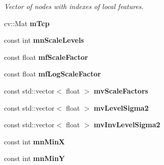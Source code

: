 \begin{DoxyCompactItemize}
\begin{DoxyCompactList}\small\item\em Vector of nodes with indexes of local features. \end{DoxyCompactList}\item 
\hypertarget{classORB__SLAM2_1_1KeyFrame_aab9c8e2e4aa4757ad0be28b2f49a3cf7}{cv\-::\-Mat {\bfseries m\-Tcp}}\label{classORB__SLAM2_1_1KeyFrame_aab9c8e2e4aa4757ad0be28b2f49a3cf7}

\item 
\hypertarget{classORB__SLAM2_1_1KeyFrame_abd3b2544330774672483656955e0ca03}{const int {\bfseries mn\-Scale\-Levels}}\label{classORB__SLAM2_1_1KeyFrame_abd3b2544330774672483656955e0ca03}

\item 
\hypertarget{classORB__SLAM2_1_1KeyFrame_a18fbd1aa1da7c7cd68cb05d8e5b78a08}{const float {\bfseries mf\-Scale\-Factor}}\label{classORB__SLAM2_1_1KeyFrame_a18fbd1aa1da7c7cd68cb05d8e5b78a08}

\item 
\hypertarget{classORB__SLAM2_1_1KeyFrame_ae7ca053915d4aaba66c1fd5962182d14}{const float {\bfseries mf\-Log\-Scale\-Factor}}\label{classORB__SLAM2_1_1KeyFrame_ae7ca053915d4aaba66c1fd5962182d14}

\item 
\hypertarget{classORB__SLAM2_1_1KeyFrame_a8cdc02a7bccd3b75e61351a1f14f9c04}{const std\-::vector$<$ float $>$ {\bfseries mv\-Scale\-Factors}}\label{classORB__SLAM2_1_1KeyFrame_a8cdc02a7bccd3b75e61351a1f14f9c04}

\item 
\hypertarget{classORB__SLAM2_1_1KeyFrame_aa4a9029bf7ea62953ac38644756fcd3b}{const std\-::vector$<$ float $>$ {\bfseries mv\-Level\-Sigma2}}\label{classORB__SLAM2_1_1KeyFrame_aa4a9029bf7ea62953ac38644756fcd3b}

\item 
\hypertarget{classORB__SLAM2_1_1KeyFrame_a320d543b9585072c264b4e6f7e334bad}{const std\-::vector$<$ float $>$ {\bfseries mv\-Inv\-Level\-Sigma2}}\label{classORB__SLAM2_1_1KeyFrame_a320d543b9585072c264b4e6f7e334bad}

\item 
\hypertarget{classORB__SLAM2_1_1KeyFrame_a02b00239e47ff44e5578c2eeaf3d3cc8}{const int {\bfseries mn\-Min\-X}}\label{classORB__SLAM2_1_1KeyFrame_a02b00239e47ff44e5578c2eeaf3d3cc8}

\item 
\hypertarget{classORB__SLAM2_1_1KeyFrame_ab96accf480c4bbc3212efb47278db8c5}{const int {\bfseries mn\-Min\-Y}}\label{classORB__SLAM2_1_1KeyFrame_ab96accf480c4bbc3212efb47278db8c5}


\end{DoxyCompactItemize}
